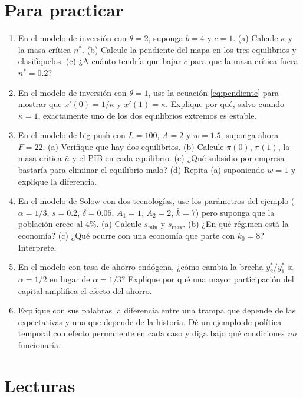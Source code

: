 \documentclass[12pt,letterpaper]{article}
\begin{document}
\section{Para practicar}
\enlargethispage{1.3\baselineskip}

\begin{enumerate}[leftmargin=*, itemsep=0.5em]
  \item En el modelo de inversión con $\theta=2$, suponga $b=4$ y $c=1$. (a) Calcule $\kappa$ y la masa crítica $n^*$. (b) Calcule la pendiente del mapa en los tres equilibrios y clasifíquelos. (c) ¿A cuánto tendría que bajar $c$ para que la masa crítica fuera $n^*=0.2$?
  \item En el modelo de inversión con $\theta=1$, use la ecuación \eqref{eq:pendiente} para mostrar que $x'(0)=1/\kappa$ y $x'(1)=\kappa$. Explique por qué, salvo cuando $\kappa=1$, exactamente uno de los dos equilibrios extremos es estable.
  \item En el modelo de big push con $L=100$, $A=2$ y $w=1.5$, suponga ahora $F=22$. (a) Verifique que hay dos equilibrios. (b) Calcule $\pi(0)$, $\pi(1)$, la masa crítica $\bar n$ y el PIB en cada equilibrio. (c) ¿Qué subsidio por empresa bastaría para eliminar el equilibrio malo? (d) Repita (a) suponiendo $w=1$ y explique la diferencia.
  \item En el modelo de Solow con dos tecnologías, use los parámetros del ejemplo ($\alpha=1/3$, $s=0.2$, $\delta=0.05$, $A_1=1$, $A_2=2$, $\bar k=7$) pero suponga que la población crece al $4\%$. (a) Calcule $s_{\min}$ y $s_{\max}$. (b) ¿En qué régimen está la economía? (c) ¿Qué ocurre con una economía que parte con $k_0=8$? Interprete.
  \item En el modelo con tasa de ahorro endógena, ¿cómo cambia la brecha $y_2^*/y_1^*$ si $\alpha=1/2$ en lugar de $\alpha=1/3$? Explique por qué una mayor participación del capital amplifica el efecto del ahorro.
  \item Explique con sus palabras la diferencia entre una trampa que depende de las expectativas y una que depende de la historia. Dé un ejemplo de política temporal con efecto permanente en cada caso y diga bajo qué condiciones \emph{no} funcionaría.
\end{enumerate}

\section*{Lecturas}
\end{document}
